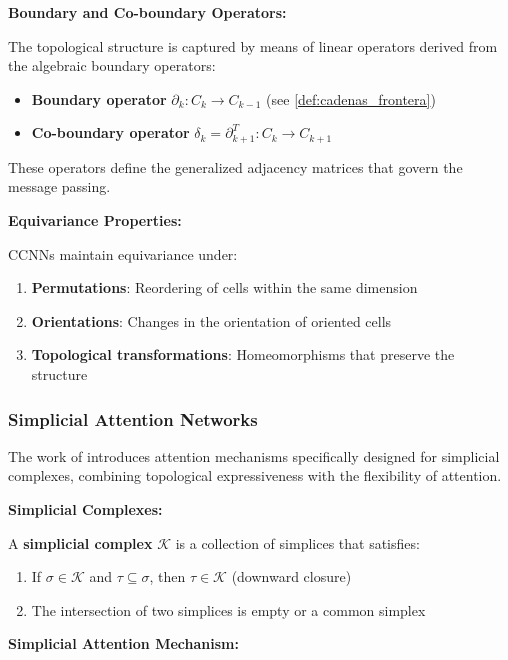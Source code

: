 \textbf{Boundary and Co-boundary Operators:}

The topological structure is captured by means of linear operators derived from the algebraic boundary operators:
\begin{itemize}
    \item \textbf{Boundary operator} $\partial_k: C_k \to C_{k-1}$ (see \autoref{def:cadenas_frontera})
    \item \textbf{Co-boundary operator} $\delta_k = \partial_{k+1}^T: C_k \to C_{k+1}$
\end{itemize}

These operators define the generalized adjacency matrices that govern the message passing.

\textbf{Equivariance Properties:}

CCNNs maintain equivariance under:
\begin{enumerate}
    \item \textbf{Permutations}: Reordering of cells within the same dimension
    \item \textbf{Orientations}: Changes in the orientation of oriented cells
    \item \textbf{Topological transformations}: Homeomorphisms that preserve the structure
\end{enumerate}

\subsubsection{Simplicial Attention Networks}

The work of \citet{giusti2022simplicial} introduces attention mechanisms specifically designed for simplicial complexes, combining topological expressiveness with the flexibility of attention.

\textbf{Simplicial Complexes:}

\begin{definition}
A \textbf{simplicial complex} $\mathcal{K}$ is a collection of simplices that satisfies:
\begin{enumerate}
    \item If $\sigma \in \mathcal{K}$ and $\tau \subseteq \sigma$, then $\tau \in \mathcal{K}$ (downward closure)
    \item The intersection of two simplices is empty or a common simplex
\end{enumerate}
\end{definition}

\textbf{Simplicial Attention Mechanism:}

